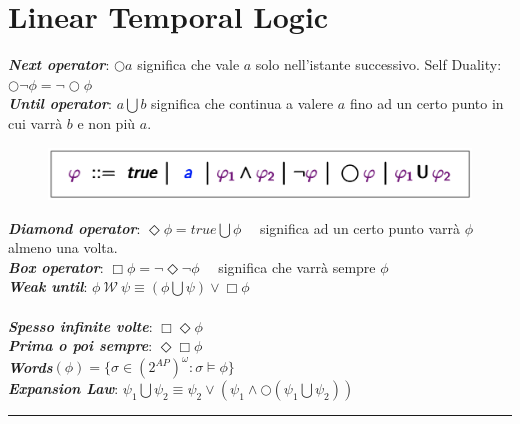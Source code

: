 \documentclass[a4paper, notitlepage, 9pt]{extreport}
\begin{document}
\chapter*{Linear Temporal Logic}
\begin{multicols}{2}
	\noindent
	\textit{\textbf{Next operator}}: $\bigcirc a$ significa che vale $a$ solo nell'istante successivo. Self Duality: $\bigcirc \lnot \phi = \lnot \bigcirc \phi$\\
	\textit{\textbf{Until operator}}: $a \bigcup b$ significa che continua a valere $a$ fino ad un certo punto in cui varrà $b$ e non più $a$.
	\columnbreak
	\begin{figure}[H]
		\centering
		\includegraphics[scale=0.2]{LTL}
	\end{figure}
\end{multicols}
\noindent
\textit{\textbf{Diamond operator}}: $\Diamond \phi= true \bigcup \phi$ ~~significa ad un certo punto varrà $\phi$ almeno una volta.\\
\textit{\textbf{Box operator}}: $\Box \phi = \lnot \Diamond \lnot \phi$ ~~significa che varrà sempre $\phi$\\
\textit{\textbf{Weak until}}: $\phi ~\mathcal{W}~ \psi \equiv (\phi \bigcup \psi) \lor \Box \phi$\\\\
\textit{\textbf{Spesso infinite volte}}: $\Box \Diamond \phi$\\
\textit{\textbf{Prima o poi sempre}}: $\Diamond \Box \phi$\\
\textit{\textbf{Words}}$(\phi) = \{\sigma \in (2^{AP})^\omega: \sigma \vDash \phi \}$\\
\textit{\textbf{Expansion Law}}: $\psi_1 \bigcup \psi_2 \equiv \psi_2 \lor (\psi_1 \land \bigcirc(\psi_1 \bigcup \psi_2))$\\

\hrule
\end{document}
